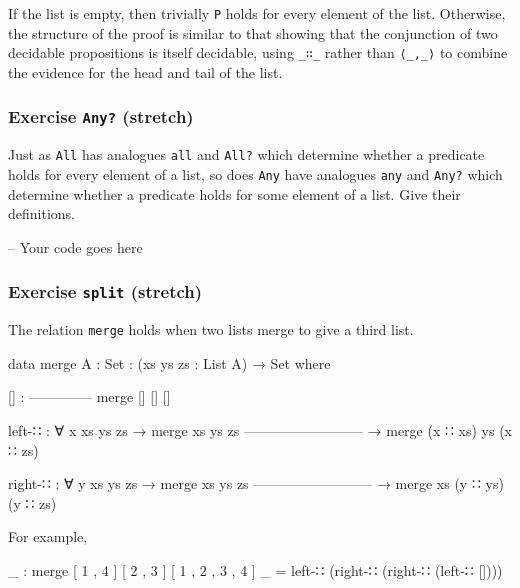 If the list is empty, then trivially \texttt{P} holds for every element
of the list. Otherwise, the structure of the proof is similar to that
showing that the conjunction of two decidable propositions is itself
decidable, using \texttt{\_∷\_} rather than \texttt{⟨\_,\_⟩} to combine
the evidence for the head and tail of the list.

\hypertarget{exercise-any-stretch}{%
\subsubsection{\texorpdfstring{Exercise \texttt{Any?}
(stretch)}{Exercise Any? (stretch)}}\label{exercise-any-stretch}}

Just as \texttt{All} has analogues \texttt{all} and \texttt{All?} which
determine whether a predicate holds for every element of a list, so does
\texttt{Any} have analogues \texttt{any} and \texttt{Any?} which
determine whether a predicate holds for some element of a list. Give
their definitions.

\begin{fence}
\begin{code}
-- Your code goes here
\end{code}
\end{fence}

\hypertarget{exercise-split-stretch}{%
\subsubsection{\texorpdfstring{Exercise \texttt{split}
(stretch)}{Exercise split (stretch)}}\label{exercise-split-stretch}}

The relation \texttt{merge} holds when two lists merge to give a third
list.

\begin{fence}
\begin{code}
data merge {A : Set} : (xs ys zs : List A) → Set where

  [] :
      --------------
      merge [] [] []

  left-∷ : ∀ {x xs ys zs}
    → merge xs ys zs
      --------------------------
    → merge (x ∷ xs) ys (x ∷ zs)

  right-∷ : ∀ {y xs ys zs}
    → merge xs ys zs
      --------------------------
    → merge xs (y ∷ ys) (y ∷ zs)
\end{code}
\end{fence}

For example,

\begin{fence}
\begin{code}
_ : merge [ 1 , 4 ] [ 2 , 3 ] [ 1 , 2 , 3 , 4 ]
_ = left-∷ (right-∷ (right-∷ (left-∷ [])))

\end{code}
\end{fence}

